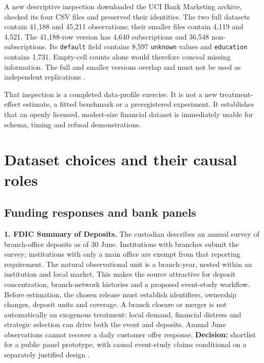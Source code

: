 A new descriptive inspection downloaded the UCI Bank Marketing archive,
checked its four CSV files and preserved their identities. The two full
datasets contain 41,188 and 45,211 observations; their smaller files
contain 4,119 and 4,521. The 41,188-row version has 4,640 subscriptions
and 36,548 non-subscriptions. Its \texttt{default} field contains 8,597
\texttt{unknown} values and \texttt{education} contains 1,731.
Empty-cell counts alone would therefore conceal missing information. The
full and smaller versions overlap and must not be used as independent
replications \citep{pd15_uci_bank,pd15_profile}.

That inspection is a completed data-profile exercise. It is not a new
treatment-effect estimate, a fitted benchmark or a preregistered
experiment. It establishes that an openly licensed, modest-size
financial dataset is immediately usable for schema, timing and refusal
demonstrations.

\hypertarget{pd15:datasets}{%
\chapter{Dataset choices and their causal roles}\label{pd15:datasets}}

\hypertarget{funding-responses-and-bank-panels}{%
\section{Funding responses and bank
panels}\label{funding-responses-and-bank-panels}}

\textbf{1. FDIC Summary of Deposits.} The custodian describes an annual
survey of branch-office deposits as of 30 June. Institutions with
branches submit the survey; institutions with only a main office are
exempt from that reporting requirement. The natural observational unit
is a branch-year, nested within an institution and local market. This
makes the source attractive for deposit concentration, branch-network
histories and a proposed event-study workflow. Before estimation, the
chosen release must establish identifiers, ownership changes, deposit
units and coverage. A branch closure or merger is not automatically an
exogenous treatment: local demand, financial distress and strategic
selection can drive both the event and deposits. Annual June
observations cannot recover a daily customer offer response.
\textbf{Decision:} shortlist for a public panel prototype, with causal
event-study claims conditional on a separately justified design
\citep{pd15_fdic_sod}.


